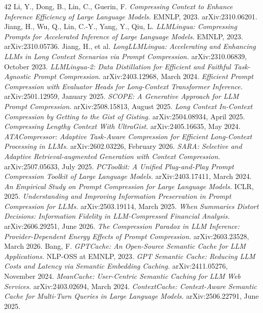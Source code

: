 \documentclass[11pt,a4paper]{article}
\begin{document}
\begin{thebibliography}{42}
\footnotesize
{} Li, Y., Dong, B., Lin, C., Guerin, F. \emph{Compressing Context to Enhance Inference Efficiency of Large Language Models.} EMNLP, 2023. arXiv:2310.06201.
 Jiang, H., Wu, Q., Lin, C.-Y., Yang, Y., Qiu, L. \emph{LLMLingua: Compressing Prompts for Accelerated Inference of Large Language Models.} EMNLP, 2023. arXiv:2310.05736.
 Jiang, H., et al. \emph{LongLLMLingua: Accelerating and Enhancing LLMs in Long Context Scenarios via Prompt Compression.} arXiv:2310.06839, October 2023.
 \emph{LLMLingua-2: Data Distillation for Efficient and Faithful Task-Agnostic Prompt Compression.} arXiv:2403.12968, March 2024.
 \emph{Efficient Prompt Compression with Evaluator Heads for Long-Context Transformer Inference.} arXiv:2501.12959, January 2025.
 \emph{SCOPE: A Generative Approach for LLM Prompt Compression.} arXiv:2508.15813, August 2025.
 \emph{Long Context In-Context Compression by Getting to the Gist of Gisting.} arXiv:2504.08934, April 2025.
 \emph{Compressing Lengthy Context With UltraGist.} arXiv:2405.16635, May 2024.
 \emph{ATACompressor: Adaptive Task-Aware Compression for Efficient Long-Context Processing in LLMs.} arXiv:2602.03226, February 2026.
 \emph{SARA: Selective and Adaptive Retrieval-augmented Generation with Context Compression.} arXiv:2507.05633, July 2025.
 \emph{PCToolkit: A Unified Plug-and-Play Prompt Compression Toolkit of Large Language Models.} arXiv:2403.17411, March 2024.
 \emph{An Empirical Study on Prompt Compression for Large Language Models.} ICLR, 2025.
 \emph{Understanding and Improving Information Preservation in Prompt Compression for LLMs.} arXiv:2503.19114, March 2025.
 \emph{When Summaries Distort Decisions: Information Fidelity in LLM-Compressed Financial Analysis.} arXiv:2606.29251, June 2026.
 \emph{The Compression Paradox in LLM Inference: Provider-Dependent Energy Effects of Prompt Compression.} arXiv:2603.23528, March 2026.
 Bang, F. \emph{GPTCache: An Open-Source Semantic Cache for LLM Applications.} NLP-OSS at EMNLP, 2023.
 \emph{GPT Semantic Cache: Reducing LLM Costs and Latency via Semantic Embedding Caching.} arXiv:2411.05276, November 2024.
 \emph{MeanCache: User-Centric Semantic Caching for LLM Web Services.} arXiv:2403.02694, March 2024.
 \emph{ContextCache: Context-Aware Semantic Cache for Multi-Turn Queries in Large Language Models.} arXiv:2506.22791, June 2025.

\end{thebibliography}
\end{document}
